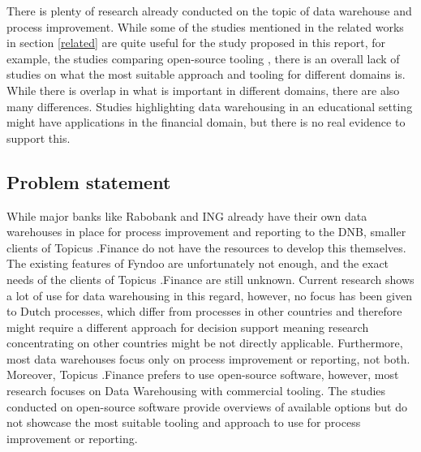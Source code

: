 \documentclass[11pt]{article}
\begin{document}
There is plenty of research already conducted on the topic of data warehouse and process improvement. While some of the studies mentioned in the related works in section \ref{related} are quite useful for the study proposed in this report, for example, the studies comparing open-source tooling \cite{thomsen2009survey}, there is an overall lack of studies on what the most suitable approach and tooling for different domains is. While there is overlap in what is important in different domains, there are also many differences. Studies highlighting data warehousing in an educational setting \cite{lapura2018development, nejres2015analysis} might have applications in the financial domain, but there is no real evidence to support this. 

\subsection{Problem statement}
While major banks like Rabobank and ING already have their own data warehouses in place for process improvement and reporting to the DNB, smaller clients of Topicus .Finance do not have the resources to develop this themselves. The existing features of Fyndoo are unfortunately not enough, and the exact needs of the clients of Topicus .Finance are still unknown. Current research shows a lot of use for data warehousing in this regard, however, no focus has been given to Dutch processes, which differ from processes in other countries and therefore might require a different approach for decision support meaning research concentrating on other countries might be not directly applicable. Furthermore, most data warehouses focus only on process improvement or reporting, not both. Moreover, Topicus .Finance prefers to use open-source software, however, most research focuses on Data Warehousing with commercial tooling. The studies conducted on open-source software provide overviews of available options but do not showcase the most suitable tooling and approach to use for process improvement or reporting.

\end{document}
